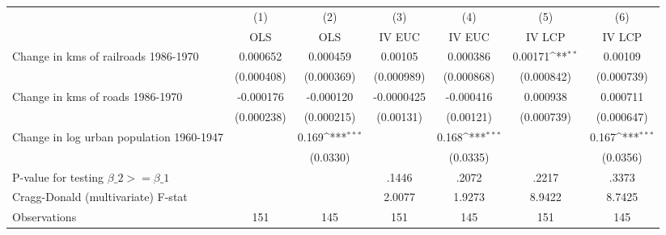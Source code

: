 {
\def\sym#1{\ifmmode^{#1}\else\(^{#1}\)\fi}
\begin{tabular}{l*{6}{c}}
\hline\hline
                &\multicolumn{1}{c}{(1)}&\multicolumn{1}{c}{(2)}&\multicolumn{1}{c}{(3)}&\multicolumn{1}{c}{(4)}&\multicolumn{1}{c}{(5)}&\multicolumn{1}{c}{(6)}\\
                &\multicolumn{1}{c}{OLS}&\multicolumn{1}{c}{OLS}&\multicolumn{1}{c}{IV EUC}&\multicolumn{1}{c}{IV EUC}&\multicolumn{1}{c}{IV LCP}&\multicolumn{1}{c}{IV LCP}\\
\hline
Change in kms of railroads 1986-1970& 0.000652         & 0.000459         &  0.00105         & 0.000386         &  0.00171\sym{**} &  0.00109         \\
                &(0.000408)         &(0.000369)         &(0.000989)         &(0.000868)         &(0.000842)         &(0.000739)         \\
[1em]
Change in kms of roads 1986-1970&-0.000176         &-0.000120         &-0.0000425         &-0.000416         & 0.000938         & 0.000711         \\
                &(0.000238)         &(0.000215)         &(0.00131)         &(0.00121)         &(0.000739)         &(0.000647)         \\
[1em]
Change in log urban population 1960-1947&                  &    0.169\sym{***}&                  &    0.168\sym{***}&                  &    0.167\sym{***}\\
                &                  & (0.0330)         &                  & (0.0335)         &                  & (0.0356)         \\
\hline
P-value for testing $\beta\_{2} >= \beta\_{1}$&                  &                  &    .1446         &    .2072         &    .2217         &    .3373         \\
Cragg-Donald (multivariate) F-stat&                  &                  &   2.0077         &   1.9273         &   8.9422         &   8.7425         \\
Observations    &      151         &      145         &      151         &      145         &      151         &      145         \\
\hline\hline
\end{tabular}
}
